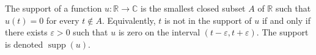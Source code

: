 The support of a function $u: \mathbb{R} \rightarrow \mathbb{C}$ is the smallest closed subset $A$ of $\mathbb{R}$ such that $u(t) = 0$ for every $t \notin A$. Equivalently, $t$ is not in the support of $u$ if and only if there exists $\varepsilon > 0$ such that $u$ is zero on the interval $(t - \varepsilon, t + \varepsilon)$. The support is denoted $\operatorname{supp}(u)$.
